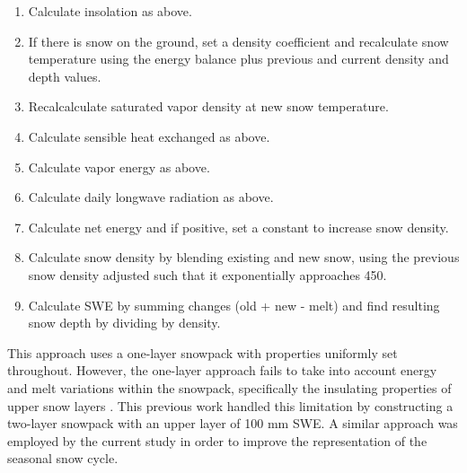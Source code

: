 \documentclass[12pt]{article}
\begin{document}
\begin{enumerate}
\begin{enumerate}
    \item Calculate insolation as above.
    \item If there is snow on the ground, set a density coefficient and recalculate snow temperature using the energy balance plus previous and current density and depth values.
    \item Recalcalculate saturated vapor density at new snow temperature.
    \item Calculate sensible heat exchanged as above.
    \item Calculate vapor energy as above.
    \item Calculate daily longwave radiation as above.
    \item Calculate net energy and if positive, set a constant to increase snow density.
    \item Calculate snow density by blending existing and new snow, using the previous snow density adjusted such that it exponentially approaches 450.
    \item Calculate SWE by summing changes (old + new - melt) and find resulting snow depth by dividing by density.
  \end{enumerate}
\end{enumerate}

This approach uses a one-layer snowpack with properties uniformly set throughout.
However, the one-layer approach fails to take into account energy and melt variations within the snowpack, specifically the insulating properties of upper snow layers \citep{jost2012distributed}.
This previous work handled this limitation by constructing a two-layer snowpack with an upper layer of 100 mm SWE.
A similar approach was employed by the current study in order to improve the representation of the seasonal snow cycle.
\end{document}
